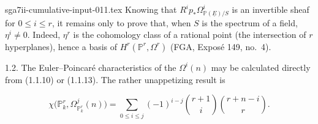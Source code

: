 \begin{filecontents*}{sga7ii-cumulative-input-011.tex}
Knowing that $R^ip_*\Omega^i_{\mathbb P(\underline E)/S}$ is an invertible
sheaf for $0\leq i\leq r$, it remains only to prove that, when $S$ is the
spectrum of a field, $\eta^i\ne0$.  Indeed, $\eta^r$ is the cohomology
class of a rational point (the intersection of $r$ hyperplanes), hence a
basis of $H^r(\mathbb P^r,\Omega^r)$ (FGA, Exposé 149, no.~4).

1.2. The Euler--Poincaré characteristics of the $\Omega^i(n)$ may be
calculated directly from (1.1.10) or (1.1.13).  The rather unappetizing
result is

\begin{equation*}
\chi\bigl(\mathbb P^r_k,\Omega^j_{\mathbb P^r_k}(n)\bigr)
=\sum_{0\leq i\leq j}(-1)^{i-j}
\binom{r+1}{i}\binom{r+n-i}{r}.
\end{equation*}

\end{filecontents*}
